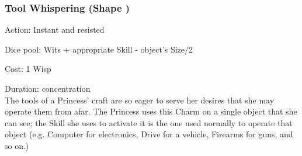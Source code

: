 \subsubsection*{Tool Whispering (Shape \textbullet\textbullet)}
\noindent Action: Instant and resisted

Dice pool: Wits + appropriate Skill - object’s Size/2

Cost: 1 Wisp

Duration: concentration \\


The tools of a Princess’ craft are so eager to serve her desires that she may operate them
from afar. The Princess uses this Charm on a single object that she can see; the Skill she uses
to activate it is the one used normally to operate that object (e.g. Computer for electronics,
Drive for a vehicle, Firearms for guns, and so on.)

